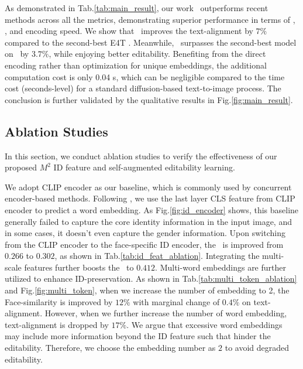  As demonstrated in Tab.\ref{tab:main_result}, our work \ours \ outperforms recent methods across all the metrics, demonstrating superior performance in terms of \editb, \Imetric, and encoding speed. 
We show that \ours \ improves the text-alignment by $7\%$ compared to the second-best E4T \cite{gal2023designing}. Meanwhile,  \ours \ surpasses the second-best model \cite{wei2023elite} on \Imetric \  by $3.7\%$, while enjoying better editability. Benefiting from the direct encoding rather than optimization for unique embeddings, the additional computation cost is only 0.04 s, which can be negligible compared to the time cost (seconds-level) for a standard diffusion-based text-to-image process. The conclusion is further validated by the qualitative results in Fig.\ref{fig:main_result}.






\subsection{Ablation Studies}
\vspace{-0.2cm}
In this section, we conduct ablation studies to verify the effectiveness of our proposed  $M^2$ ID feature and self-augmented editability learning.
 
We adopt CLIP encoder as our baseline, which is commonly used by concurrent encoder-based methods. Following \cite{wei2023elite, shi2023instantbooth}, we use the last layer CLS feature from CLIP encoder to predict a word embedding. As Fig.\ref{fig:id_encoder} shows, this baseline generally failed to capture the core identity information in the input image, and in some cases, it doesn't even capture the gender information.  
Upon switching from the CLIP encoder to the face-specific ID encoder, the \Imetric \ is improved from $0.266$ to $0.302$, as shown in Tab.\ref{tab:id_feat_ablation}. Integrating the multi-scale features further boosts the \Imetric \ to $0.412$.
Multi-word embeddings are  further utilized to enhance ID-preservation. As shown in Tab.\ref{tab:multi_token_ablation} and Fig.\ref{fig:multi_token}, when we increase the number of embedding  to 2, the Face-similarity is improved by $12\%$ with marginal change of $0.4\%$ on text-alignment. However, when we further increase the number of word embedding,  text-alignment is dropped by $17\%$. We argue that excessive word embeddings may include more information beyond the ID feature such that hinder the editability. Therefore, we choose the embedding number as $2$ to avoid degraded editability.  

